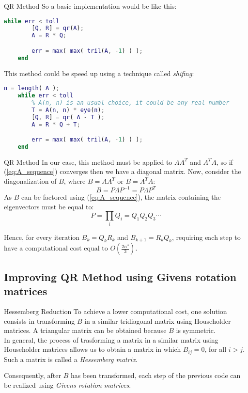\documentclass[10pt]{beamer}
\begin{document}
\begin{frame}[fragile]{QR Method}
    So a basic implementation would be like this:
    \begin{lstlisting}[language=Matlab]
    while err < toll
        [Q, R] = qr(A);
        A = R * Q;

        err = max( max( tril(A, -1) ) );
    end \end{lstlisting}
    This method could be speed up using a technique called \textit{shifing}:
    \begin{lstlisting}[language=Matlab]
    n = length( A );
    while err < toll
        % A(n, n) is an usual choice, it could be any real number
        T = A(n, n) * eye(n);
        [Q, R] = qr( A - T );
        A = R * Q + T;

        err = max( max( tril(A, -1) ) );
    end \end{lstlisting}
\end{frame}

\begin{frame}{QR Method}
    In our case, this method must be applied to $A A^T$ and $A^T A$, so if (\ref{eq:A_sequence}) converges then we have a diagonal matrix. \newline
    Now, consider the diagonalization of $B$, where $B = A A^T$ or $B = A^T A$:
    $$
    B = P \Lambda P^{-1} =  P \Lambda P^T
    $$
    As $B$ can be factored using (\ref{eq:A_sequence}), the matrix containing the eigenvectors must be equal to:
    $$
    P = \prod_i Q_i = Q_1 Q_2 Q_3 \cdots
    $$ \bigskip

    Hence, for every iteration $B_k = Q_k R_k$ and $B_{k+1} = R_k Q_k$, requiring each step to have a computational cost equal to $O(\frac{2 n^3}{3})$.
\end{frame}

\subsection{Improving QR Method using Givens rotation matrices}

\begin{frame}{Hessemberg Reduction}
    To achieve a lower computational cost, one solution consists in transforming $B$ in a similar tridiagonal matrix using Householder matrices. \newline
    A triangular matrix can be obtained because $B$ is symmetric. \\  \bigskip
    In general, the process of trasforming a matrix in a similar matrix using Householder matrices allows us to obtain a matrix in which $B_{ij} = 0$, for all $i > j$. Such a matrix is called a \textit{Hessemberg matrix}. \bigskip

    Consequently, after $B$ has been transformed, each step of the previous code can be realized using \textit{Givens rotation matrices}.
\end{frame}
\end{document}
